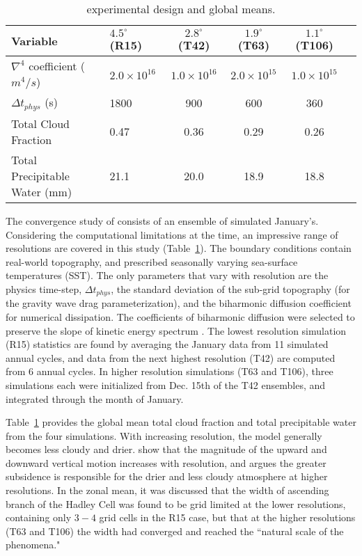  \begin{table}
 \caption{\cite{KW1991JGR} experimental design and global means.}
 \centering
 \scriptsize
 \begin{tabular}{llcccc}
 \hline
 Variable & $4.5^{\circ}$ (R15) & $2.8^{\circ}$ (T42) & $1.9^{\circ}$ (T63)  & $1.1^{\circ}$ (T106) \\
 \hline
   $\nabla^{4}$ coefficient ($m^4/s$) & $2.0 \times 10^{16}$ & $1.0 \times 10^{16}$ & $2.0 \times 10^{15}$ & $1.0 \times 10^{15}$ \\
   $\Delta t_{phys}$ (s) & 1800 & 900 & 600 & 360 \\
   Total Cloud Fraction & 0.47 & 0.36 & 0.29 & 0.26 \\
   Total Precipitable Water (mm) & 21.1 & 20.0 & 18.9 & 18.8 \\
 \hline
 \end{tabular}
 \label{tbl:table1-1}
 \end{table}

The convergence study of \cite{KW1991JGR} consists of an ensemble of simulated January's. Considering the computational limitations at the time, an impressive range of resolutions are covered in this study (Table~\ref{tbl:table1-1}). The boundary conditions contain real-world topography, and prescribed seasonally varying sea-surface temperatures (SST). The only parameters that vary with resolution are the physics time-step, $\Delta t_{phys}$, the standard deviation of the sub-grid topography (for the gravity wave drag parameterization), and the biharmonic diffusion coefficient for numerical dissipation. The coefficients of biharmonic diffusion were selected to preserve the slope of kinetic energy spectrum \citep[see][]{B1991JCLIM}. The lowest resolution simulation (R15) statistics are found by averaging the January data from 11 simulated annual cycles, and data from the next highest resolution (T42) are computed from 6 annual cycles. In higher resolution simulations (T63 and T106), three simulations each were initialized from Dec. 15th of the T42 ensembles, and integrated through the month of January.

Table~\ref{tbl:table1-1} provides the global mean total cloud fraction and total precipitable water from the four simulations. With increasing resolution, the model generally becomes less cloudy and drier. \cite{KW1991JGR} show that the magnitude of the upward and downward vertical motion increases with resolution, and argues the greater subsidence is responsible for the drier and less cloudy atmosphere at higher resolutions. In the zonal mean, it was discussed that the width of ascending branch of the Hadley Cell was found to be grid limited at the lower resolutions, containing only $3-4$ grid cells in the R15 case, but that at the higher resolutions (T63 and T106) the width had converged and reached the ``natural scale of the phenomena."


